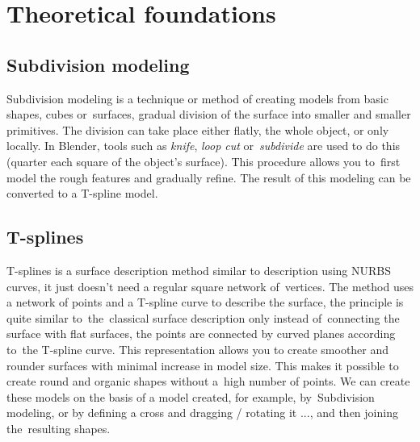 \documentclass[12pt,a4paper,titlepage,final,tikz,border=4mm]{report}
\begin{document}
\section{Theoretical foundations}
\subsection{Subdivision modeling}

Subdivision modeling\cite{sm} is a technique or method of creating models from basic shapes, cubes or~surfaces, gradual division of the surface into smaller and smaller primitives. The division can take place either flatly, the whole object, or only locally. In Blender, tools such as \textit{knife}, \textit{loop cut} or~\textit{subdivide} are used to do this (quarter each square of the object's surface). This procedure allows you to~first model the rough features and gradually refine. The result of this modeling can be converted to a T-spline model.

\subsection{T-splines}
T-splines is a surface description method similar to description using NURBS curves, it just doesn't need a regular square network of~vertices. The method uses a network of points and a T-spline curve to describe the surface, the principle is quite similar to~the~classical surface description only instead of~connecting the surface with flat surfaces, the points are connected by curved planes according to~the T-spline curve. This representation allows you to create smoother and rounder surfaces with minimal increase in model size. This makes it possible to create round and organic shapes without a~high number of points. We can create these models on the basis of a model created, for example, by~Subdivision modeling, or by defining a cross and dragging / rotating it ..., and then joining the~resulting shapes.
\end{document}
